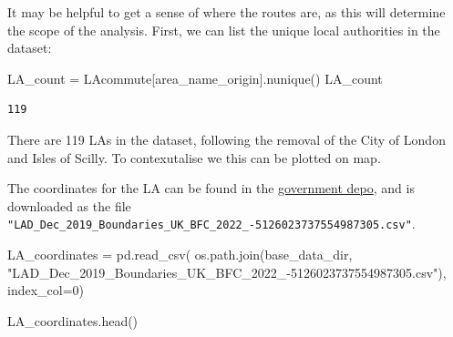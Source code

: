 \documentclass[
  number]{elsarticle}
\newenvironment{Shaded}{\begin{snugshade}}{\end{snugshade}}
\newcommand{\DecValTok}[1]{\textcolor[rgb]{0.68,0.00,0.00}{#1}}
\newcommand{\NormalTok}[1]{\textcolor[rgb]{0.00,0.23,0.31}{#1}}
\newcommand{\OperatorTok}[1]{\textcolor[rgb]{0.37,0.37,0.37}{#1}}
\newcommand{\StringTok}[1]{\textcolor[rgb]{0.13,0.47,0.30}{#1}}
\begin{document}
It may be helpful to get a sense of where the routes are, as this will
determine the scope of the analysis. First, we can list the unique local
authorities in the dataset:

\begin{Shaded}
\begin{Highlighting}[]
\NormalTok{LA\_count }\OperatorTok{=}\NormalTok{ LAcommute[}\StringTok{\textquotesingle{}area\_name\_origin\textquotesingle{}}\NormalTok{].nunique()}
\NormalTok{LA\_count}
\end{Highlighting}
\end{Shaded}

\begin{verbatim}
119
\end{verbatim}

There are 119 LAs in the dataset, following the removal of the City of
London and Isles of Scilly. To contexutalise we this can be plotted on
map.

The coordinates for the LA can be found in the
\href{https://geoportal.statistics.gov.uk/datasets/9cb3c710143649499ff6acaca927d205_0/explore}{government
depo}, and is downloaded as the file
\texttt{"LAD\_Dec\_2019\_Boundaries\_UK\_BFC\_2022\_-5126023737554987305.csv"}.

\begin{Shaded}
\begin{Highlighting}[]
\NormalTok{LA\_coordinates }\OperatorTok{=}\NormalTok{ pd.read\_csv(}
\NormalTok{    os.path.join(base\_data\_dir, }\StringTok{"LAD\_Dec\_2019\_Boundaries\_UK\_BFC\_2022\_{-}5126023737554987305.csv"}\NormalTok{), index\_col}\OperatorTok{=}\DecValTok{0}\NormalTok{)}

\NormalTok{LA\_coordinates.head()}
\end{Highlighting}
\end{Shaded}
\end{document}

